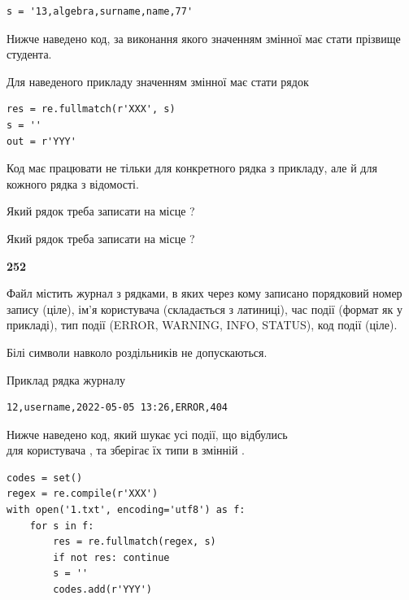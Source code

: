 \begin{verbatim}
s = '13,algebra,surname,name,77'
\end{verbatim}


Нижче наведено код, за виконання якого значенням змінної  має стати прізвище студента.

Для наведеного прикладу значенням змінної  має стати рядок 



\begin{verbatim}
res = re.fullmatch(r'XXX', s)
s = ''
out = r'YYY'
\end{verbatim}


Код має працювати не тільки для конкретного рядка з прикладу, але й для кожного рядка з відомості.




Який рядок треба записати на місце  ?\par
\vspace{5mm}


Який рядок треба записати на місце  ?\par


\newpage

{\begin {center}\textbf{ 252}\end {center}}\par
Файл  містить журнал з рядками, в яких через кому записано поряд\-ко\-вий номер запису (ціле), ім'я користувача (складається з латиниці), час події (фор\-мат як у прикладі), тип події (ERROR, WARNING, INFO, STATUS), код події (ціле).

Білі символи навколо роздільників не допускаються.

Приклад рядка журналу



\begin{verbatim}
12,username,2022-05-05 13:26,ERROR,404
\end{verbatim}


Нижче наведено код, який шукає усі події, що відбулись\\ для користувача , та зберігає їх типи в змінній .



\begin{verbatim}
codes = set()
regex = re.compile(r'XXX')
with open('1.txt', encoding='utf8') as f:
    for s in f:
        res = re.fullmatch(regex, s)
        if not res: continue
        s = ''
        codes.add(r'YYY')
\end{verbatim}





